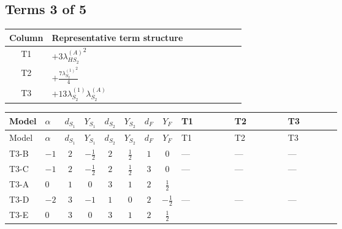 \documentclass[8pt]{article}
\begin{document}
\begin{landscape}
\subsection*{Terms 3 of 5}
\begin{center}
\begin{tabular}{@{}c >{\raggedright\arraybackslash}p{0.82\linewidth}@{}}
\toprule
Column & Representative term structure \\
\midrule
T1 & \(\displaystyle +3 {\lambda_{HS_2}^{(A)}}^2\) \\
\midrule
T2 & \(\displaystyle +\frac{7 {\lambda_{S_2}^{(1)}}^2}{4}\) \\
\midrule
T3 & \(\displaystyle +13 {\lambda_{S_2}^{(1)}} {\lambda_{S_2}^{(A)}}\) \\
\midrule
\bottomrule
\end{tabular}
\end{center}
\smallskip
\tiny
\begin{longtable}{@{}llcccccc >{\raggedright\arraybackslash}p{0.21\linewidth} >{\raggedright\arraybackslash}p{0.21\linewidth} >{\raggedright\arraybackslash}p{0.21\linewidth}@{}}
\toprule
Model & $\alpha$ & $d_{S_1}$ & $Y_{S_1}$ & $d_{S_2}$ & $Y_{S_2}$ & $d_F$ & $Y_F$ & T1 & T2 & T3 \\
\midrule
\endfirsthead
\toprule
Model & $\alpha$ & $d_{S_1}$ & $Y_{S_1}$ & $d_{S_2}$ & $Y_{S_2}$ & $d_F$ & $Y_F$ & T1 & T2 & T3 \\
\midrule
\endhead
T3-B & $-1$ & $2$ & $-\frac{1}{2}$ & $2$ & $\frac{1}{2}$ & $1$ & $0$ & --- & --- & --- \\
\midrule
T3-C & $-1$ & $2$ & $-\frac{1}{2}$ & $2$ & $\frac{1}{2}$ & $3$ & $0$ & --- & --- & --- \\
\midrule
T3-A & $0$ & $1$ & $0$ & $3$ & $1$ & $2$ & $\frac{1}{2}$ & \scriptsize\adjustbox{max width=\linewidth}{$\begin{gathered} +3 {\lambda_{HS_2}^{(A)}}^2\end{gathered}$} & \scriptsize\adjustbox{max width=\linewidth}{$\begin{gathered} +\frac{7 {\lambda_{S_2}^{(1)}}^2}{4}\end{gathered}$} & \scriptsize\adjustbox{max width=\linewidth}{$\begin{gathered} +13 {\lambda_{S_2}^{(1)}} {\lambda_{S_2}^{(A)}}\end{gathered}$} \\
\midrule
T3-D & $-2$ & $3$ & $-1$ & $1$ & $0$ & $2$ & $-\frac{1}{2}$ & --- & --- & --- \\
\midrule
T3-E & $0$ & $3$ & $0$ & $3$ & $1$ & $2$ & $\frac{1}{2}$ & \scriptsize\adjustbox{max width=\linewidth}{$\begin{gathered} +3 {\lambda_{HS_2}^{(A)}}^2\end{gathered}$} & \scriptsize\adjustbox{max width=\linewidth}{$\begin{gathered} +\frac{7 {\lambda_{S_2}^{(1)}}^2}{4}\end{gathered}$} & \scriptsize\adjustbox{max width=\linewidth}{$\begin{gathered} +13 {\lambda_{S_2}^{(1)}} {\lambda_{S_2}^{(A)}}\end{gathered}$} \\

\end{longtable}
\end{landscape}
\end{document}
